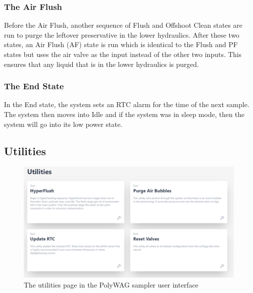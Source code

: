 \documentclass[11pt, letterpaper]{article}
\begin{document}
\subsubsection{The Air Flush}
Before the Air Flush, another sequence of Flush and Offshoot Clean states are run to purge the leftover preservative in the lower hydraulics. After these two states, an Air Flush (AF) state is run which is identical to the Flush and PF states but uses the air valve as the input instead of the other two inputs. This ensures that any liquid that is in the lower hydraulics is purged. 

\subsubsection{The End State}
In the End state, the system sets an RTC alarm for the time of the next sample. The system then moves into Idle and if the system was in sleep mode, then the system will go into its low power state.

\subsection{Utilities}

\begin{figure}[H]
	\centering
	\includegraphics[scale=0.5]{./Assets/Utilities.png}
	\caption{The utilities page in the PolyWAG sampler user interface}
\end{figure}
\end{document}
